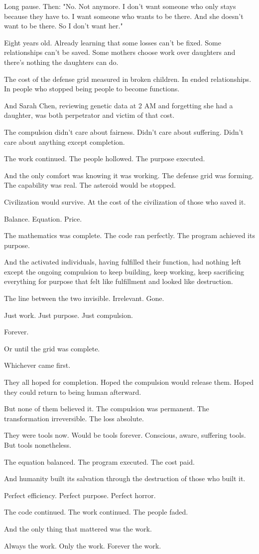 Long pause. Then: "No. Not anymore. I don't want someone who only stays because they have to. I want someone who wants to be there. And she doesn't want to be there. So I don't want her."

Eight years old. Already learning that some losses can't be fixed. Some relationships can't be saved. Some mothers choose work over daughters and there's nothing the daughters can do.

The cost of the defense grid measured in broken children. In ended relationships. In people who stopped being people to become functions.

And Sarah Chen, reviewing genetic data at 2 AM and forgetting she had a daughter, was both perpetrator and victim of that cost.

The compulsion didn't care about fairness. Didn't care about suffering. Didn't care about anything except completion.

The work continued. The people hollowed. The purpose executed.

And the only comfort was knowing it was working. The defense grid was forming. The capability was real. The asteroid would be stopped.

Civilization would survive. At the cost of the civilization of those who saved it.

Balance. Equation. Price.

The mathematics was complete. The code ran perfectly. The program achieved its purpose.

And the activated individuals, having fulfilled their function, had nothing left except the ongoing compulsion to keep building, keep working, keep sacrificing everything for purpose that felt like fulfillment and looked like destruction.

The line between the two invisible. Irrelevant. Gone.

Just work. Just purpose. Just compulsion.

Forever.

Or until the grid was complete.

Whichever came first.

They all hoped for completion. Hoped the compulsion would release them. Hoped they could return to being human afterward.

But none of them believed it. The compulsion was permanent. The transformation irreversible. The loss absolute.

They were tools now. Would be tools forever. Conscious, aware, suffering tools. But tools nonetheless.

The equation balanced. The program executed. The cost paid.

And humanity built its salvation through the destruction of those who built it.

Perfect efficiency. Perfect purpose. Perfect horror.

The code continued. The work continued. The people faded.

And the only thing that mattered was the work.

Always the work. Only the work. Forever the work.

